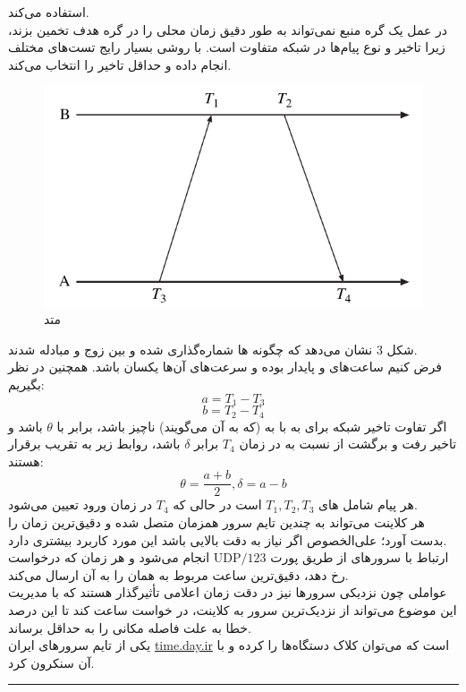 \documentclass{article}
\begin{document}
\begin{multicols}{2}
استفاده می‌کند.\\
در عمل یک گره منبع نمی‌تواند به طور دقیق زمان محلی را در گره هدف تخمین بزند، زیرا تاخیر و نوع پیام‌ها در شبکه متفاوت است.
با روشی بسیار رایج تست‌های مختلف انجام داده و حداقل تاخیر را انتخاب می‌کند.\\
\begin{figure}[H]
    \centering
    \includegraphics[width=0.99\linewidth]{Photos/HW2/delay.png}
    \caption{متد
    }
    \label{fig:my_label}
\end{figure}
شکل 3 نشان می‌دهد که چگونه 
ها شماره‌گذاری شده و بین زوج
و
مبادله شدند.\\
فرض کنیم ساعت‌های
و
پایدار بوده و سرعت‌های آن‌ها یکسان باشد. همچنین در نظر بگیریم:
$$a = T_1 - T_3$$
$$b = T_2 - T_4$$
اگر تفاوت تاخیر شبکه برای
به
با
به
(که به آن
می‌گویند)
ناچیز باشد، 
برابر با 
$\theta$
باشد و تاخیر رفت و برگشت از
نسبت به
در زمان
$T_4$
برابر
$\delta$
باشد، روابط زیر به تقریب برقرار هستند:
$$\theta = \dfrac{a + b}{2}, \delta = a - b$$
هر پیام شامل
های 
$T_1, T_2, T_3$
است در حالی که 
$T_4$
در زمان ورود تعیین می‌شود.\\
هر کلاینت می‌تواند به چندین تایم سرور
همزمان متصل شده و دقیق‌ترین زمان را بدست آورد؛ علی‌الخصوص اگر نیاز به دقت بالایی باشد این مورد کاربرد بیشتری دارد.\\
ارتباط با سرورهای
از طریق پورت
$\text{UDP}/123$
انجام می‌شود و هر زمان که درخواست رخ دهد، دقیق‌ترین ساعت مربوط به همان
را به آن ارسال می‌کند.\\
عواملی چون نزدیکی سرورها نیز در دقت زمان اعلامی تأثیرگذار هستند که
با مدیریت این موضوع می‌تواند از نزدیک‌ترین سرور به کلاینت، در خواست ساعت کند تا این درصد خطا به علت فاصله مکانی را به حداقل برساند.\\
یکی از تایم سرورهای ایران
\url{time.day.ir}
است که می‌توان کلاک دستگاه‌ها را
کرده و با آن سنکرون کرد.
\rule{\linewidth}{1pt}


\end{multicols}
\end{document}
